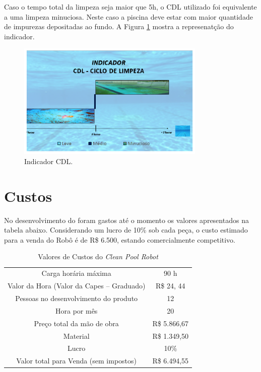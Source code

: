 Caso o tempo total da limpeza seja maior que 5h, o \textsf{CDL} utilizado foi equivalente a uma limpeza minuciosa. Neste caso a piscina deve estar com maior quantidade de impurezas depositadas ao fundo. A Figura \ref{fig:indicator} mostra a represenatção do indicador.
\par
  \begin{figure}[h]
    \centering
    \includegraphics[width=0.8\textwidth]{figures/indicator.png}
    \caption{Indicador CDL.}
    \label{fig:indicator}
  \end{figure}
  \FloatBarrier
\par

\section{Custos}
No desenvolvimento do \cpr foram gastos até o momento os valores apresentados na tabela abaixo. Considerando um lucro de 10\% sob cada peça, o custo estimado para a venda do Robô é de R\$ 6.500, estando comercialmente competitivo.
\begin{table}[h]
\centering
\caption{Valores de Custos do \textit{Clean Pool Robot}}
\label{my-label}
\begin{tabular}{@{}cc@{}}
Carga horária máxima                      & 90 h         \\
Valor da Hora (Valor da Capes – Graduado) & R\$ 24, 44   \\
Pessoas no desenvolvimento do produto     & 12           \\
Hora por mês                              & 20           \\
Preço total da mão de obra                & R\$ 5.866,67 \\
Material                                  & R\$ 1.349,50 \\
Lucro                                     & 10\%         \\ \midrule
Valor total para Venda (sem impostos)     & R\$ 6.494,55
\end{tabular}
\end{table}

